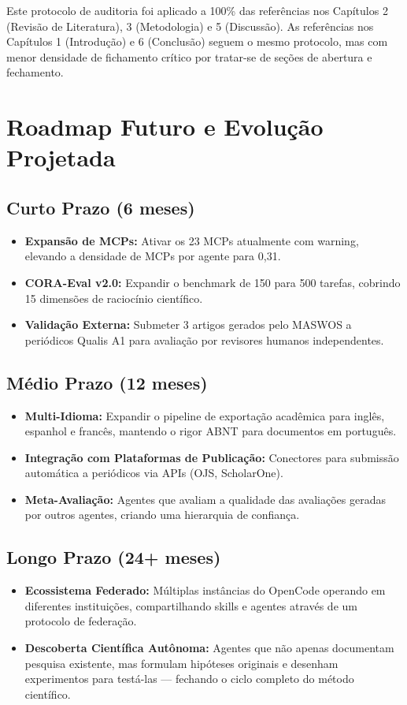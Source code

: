 Este protocolo de auditoria foi aplicado a 100\% das referências nos Capítulos 2 (Revisão de Literatura), 3 (Metodologia) e 5 (Discussão). As referências nos Capítulos 1 (Introdução) e 6 (Conclusão) seguem o mesmo protocolo, mas com menor densidade de fichamento crítico por tratar-se de seções de abertura e fechamento.

\section{Roadmap Futuro e Evolução Projetada}

\subsection{Curto Prazo (6 meses)}

\begin{itemize}
  \item \textbf{Expansão de MCPs:} Ativar os 23 MCPs atualmente com warning, elevando a densidade de MCPs por agente para 0,31.
  \item \textbf{CORA-Eval v2.0:} Expandir o benchmark de 150 para 500 tarefas, cobrindo 15 dimensões de raciocínio científico.
  \item \textbf{Validação Externa:} Submeter 3 artigos gerados pelo MASWOS a periódicos Qualis A1 para avaliação por revisores humanos independentes.
\end{itemize}

\subsection{Médio Prazo (12 meses)}

\begin{itemize}
  \item \textbf{Multi-Idioma:} Expandir o pipeline de exportação acadêmica para inglês, espanhol e francês, mantendo o rigor ABNT para documentos em português.
  \item \textbf{Integração com Plataformas de Publicação:} Conectores para submissão automática a periódicos via APIs (OJS, ScholarOne).
  \item \textbf{Meta-Avaliação:} Agentes que avaliam a qualidade das avaliações geradas por outros agentes, criando uma hierarquia de confiança.
\end{itemize}

\subsection{Longo Prazo (24+ meses)}

\begin{itemize}
  \item \textbf{Ecossistema Federado:} Múltiplas instâncias do OpenCode operando em diferentes instituições, compartilhando skills e agentes através de um protocolo de federação.
  \item \textbf{Descoberta Científica Autônoma:} Agentes que não apenas documentam pesquisa existente, mas formulam hipóteses originais e desenham experimentos para testá-las --- fechando o ciclo completo do método científico.
\end{itemize}

\newpage

